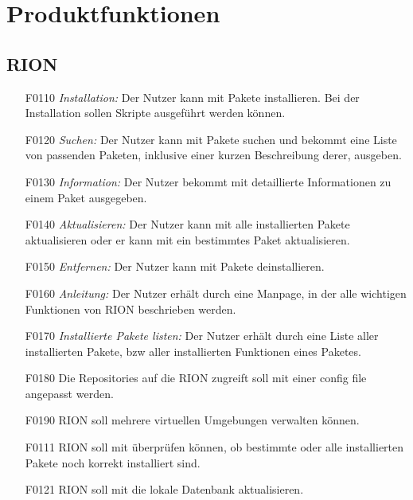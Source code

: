 \chapter{Produktfunktionen}

\section{RION}

\begin{itemize}
	\item[F0110] \textit{Installation:} Der Nutzer kann mit  Pakete installieren. Bei der Installation sollen Skripte ausgeführt werden können.
	\item[F0120] \textit{Suchen:} Der Nutzer kann mit  Pakete suchen und bekommt eine Liste von passenden Paketen, inklusive einer kurzen Beschreibung derer, ausgeben.
	\item[F0130] \textit{Information:} Der Nutzer bekommt mit  detaillierte Informationen zu einem Paket ausgegeben.
	\item[F0140] \textit{Aktualisieren:} Der Nutzer kann mit  alle installierten Pakete aktualisieren oder er kann mit  ein bestimmtes Paket aktualisieren.
	\item[F0150] \textit{Entfernen:} Der Nutzer kann mit  Pakete deinstallieren.
	\item[F0160] \textit{Anleitung:} Der Nutzer erhält durch  eine Manpage, in der alle wichtigen Funktionen von RION beschrieben werden.
	\item[F0170] \textit{Installierte Pakete listen:} Der Nutzer erhält durch  eine Liste aller installierten Pakete, bzw aller installierten Funktionen eines Paketes.
	\item[F0180] Die Repositories auf die RION zugreift soll mit einer config file angepasst werden.
	\item[F0190] RION soll mehrere virtuellen Umgebungen verwalten können.
	\item[F0111] RION soll mit 	 überprüfen können, ob bestimmte oder alle installierten Pakete noch korrekt installiert sind.
	\item[F0121] RION soll mit  die lokale Datenbank aktualisieren.
\end{itemize}

